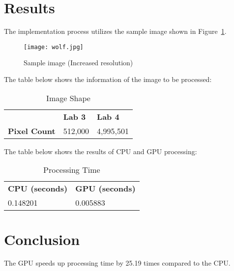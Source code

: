 \documentclass{article}
\begin{document}
\section{Results}
    The implementation process utilizes the sample image shown in Figure~\ref{fig:sample-image}.
    

    \begin{figure}[H]
        \centering
        \texttt{[image: wolf.jpg]}
        \caption{Sample image (Increased resolution)}
        \label{fig:sample-image}
    \end{figure}
    
    \noindent
    The table below shows the information of the image to be processed:
    
    \begin{table}[H]
        \centering
        \begin{tabular}{@{}lll@{}}
            & \textbf{Lab 3} & \textbf{Lab 4} \\
            \textbf{Pixel Count} & 512,000 & 4,995,501 \\ 
        \end{tabular}
        \caption{Image Shape}
        \label{tab:image-shape}
    \end{table}
    
    \noindent
    The table below shows the results of CPU and GPU processing:
    
    \begin{table}[H]
        \centering
        \begin{tabular}{@{}ll@{}}
            \textbf{CPU (seconds)} & \textbf{GPU (seconds)} \\
            0.148201 & 0.005883 \\ 
        \end{tabular}
        \caption{Processing Time}
        \label{tab:processing-time}
    \end{table}

\section{Conclusion}
    The GPU speeds up processing time by 25.19 times compared to the CPU.
\end{document}
